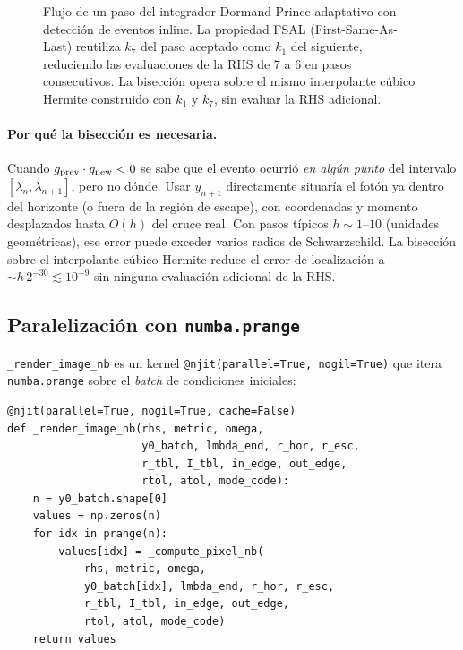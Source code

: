 \documentclass[11pt,a4paper]{article}
\begin{document}
\begin{figure}[ht]
\caption{Flujo de un paso del integrador Dormand-Prince adaptativo con
detección de eventos inline. La propiedad FSAL (First-Same-As-Last)
reutiliza $k_7$ del paso aceptado como $k_1$ del siguiente, reduciendo
las evaluaciones de la RHS de 7 a 6 en pasos consecutivos. La bisección
opera sobre el mismo interpolante cúbico Hermite construido con $k_1$ y
$k_7$, sin evaluar la RHS adicional.}
\label{fig:rk45_loop}
\end{figure}

\paragraph{Por qué la bisección es necesaria.}
Cuando $g_{\rm prev}\cdot g_{\rm new}<0$ se sabe que el evento ocurrió
\emph{en algún punto} del intervalo $[\lambda_n,\lambda_{n+1}]$, pero
no dónde. Usar $y_{n+1}$ directamente situaría el fotón ya dentro del
horizonte (o fuera de la región de escape), con coordenadas y momento
desplazados hasta $O(h)$ del cruce real. Con pasos típicos
$h\sim 1$--$10$ (unidades geométricas), ese error puede exceder
varios radios de Schwarzschild. La bisección sobre el interpolante
cúbico Hermite reduce el error de localización a
$\sim h\,2^{-30}\lesssim 10^{-9}$ sin ninguna evaluación adicional
de la RHS.

\subsection{Paralelización con \texttt{numba.prange}}

\texttt{\_render\_image\_nb} es un kernel
\texttt{@njit(parallel=True, nogil=True)} que itera \texttt{numba.prange}
sobre el \emph{batch} de condiciones iniciales:

\begin{lstlisting}[style=py, caption={Kernel paralelo sobre fotones.}]
@njit(parallel=True, nogil=True, cache=False)
def _render_image_nb(rhs, metric, omega,
                     y0_batch, lmbda_end, r_hor, r_esc,
                     r_tbl, I_tbl, in_edge, out_edge,
                     rtol, atol, mode_code):
    n = y0_batch.shape[0]
    values = np.zeros(n)
    for idx in prange(n):
        values[idx] = _compute_pixel_nb(
            rhs, metric, omega,
            y0_batch[idx], lmbda_end, r_hor, r_esc,
            r_tbl, I_tbl, in_edge, out_edge,
            rtol, atol, mode_code)
    return values
\end{lstlisting}
\end{document}
